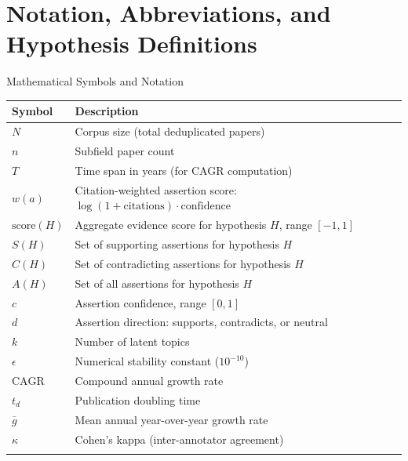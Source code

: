 \documentclass[
  ignorenonframetext,
]{beamer}
\author{\texorpdfstring{}{}}
\date{}
\newcounter{none} %
\begin{document}
\section{Notation, Abbreviations, and Hypothesis
Definitions}\label{notation-abbreviations-and-hypothesis-definitions}

\begin{frame}{Mathematical Symbols and Notation}
\protect{}\label{mathematical-symbols-and-notation}
{\def\LTcaptype{none} %
\begin{longtable}[]{@{}
  >{\raggedright\arraybackslash}p{}
  >{\raggedright\arraybackslash}p{}@{}}
\toprule\noalign{}
\begin{minipage}[b]{\linewidth}\raggedright
Symbol
\end{minipage} & \begin{minipage}[b]{\linewidth}\raggedright
Description
\end{minipage} \\
\midrule\noalign{}
\endhead
\(N\) & Corpus size (total deduplicated papers) \\
\(n\) & Subfield paper count \\
\(T\) & Time span in years (for CAGR computation) \\
\(w(a)\) & Citation-weighted assertion score:
\(\log(1 + \text{citations}) \cdot \text{confidence}\) \\
\(\text{score}(H)\) & Aggregate evidence score for hypothesis \(H\),
range \([-1, 1]\) \\
\(S(H)\) & Set of supporting assertions for hypothesis \(H\) \\
\(C(H)\) & Set of contradicting assertions for hypothesis \(H\) \\
\(A(H)\) & Set of all assertions for hypothesis \(H\) \\
\(c\) & Assertion confidence, range \([0, 1]\) \\
\(d\) & Assertion direction: supports, contradicts, or neutral \\
\(k\) & Number of latent topics \\
\(\epsilon\) & Numerical stability constant (\(10^{-10}\)) \\
\(\text{CAGR}\) & Compound annual growth rate \\
\(t_d\) & Publication doubling time \\
\(\bar{g}\) & Mean annual year-over-year growth rate \\
\(\kappa\) & Cohen's kappa (inter-annotator agreement) \\
\bottomrule\noalign{}
\end{longtable}
}
\end{frame}
\end{document}
